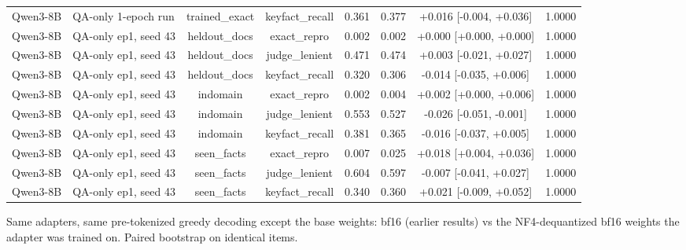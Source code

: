 \begin{table}[t]
{\begin{tabular}{llcccccc}
Qwen3-8B & QA-only 1-epoch run & trained\_exact & keyfact\_recall & 0.361 & 0.377 & +0.016 [-0.004, +0.036] & 1.0000 \\
Qwen3-8B & QA-only ep1, seed 43 & heldout\_docs & exact\_repro & 0.002 & 0.002 & +0.000 [+0.000, +0.000] & 1.0000 \\
Qwen3-8B & QA-only ep1, seed 43 & heldout\_docs & judge\_lenient & 0.471 & 0.474 & +0.003 [-0.021, +0.027] & 1.0000 \\
Qwen3-8B & QA-only ep1, seed 43 & heldout\_docs & keyfact\_recall & 0.320 & 0.306 & -0.014 [-0.035, +0.006] & 1.0000 \\
Qwen3-8B & QA-only ep1, seed 43 & indomain & exact\_repro & 0.002 & 0.004 & +0.002 [+0.000, +0.006] & 1.0000 \\
Qwen3-8B & QA-only ep1, seed 43 & indomain & judge\_lenient & 0.553 & 0.527 & -0.026 [-0.051, -0.001] & 1.0000 \\
Qwen3-8B & QA-only ep1, seed 43 & indomain & keyfact\_recall & 0.381 & 0.365 & -0.016 [-0.037, +0.005] & 1.0000 \\
Qwen3-8B & QA-only ep1, seed 43 & seen\_facts & exact\_repro & 0.007 & 0.025 & +0.018 [+0.004, +0.036] & 1.0000 \\
Qwen3-8B & QA-only ep1, seed 43 & seen\_facts & judge\_lenient & 0.604 & 0.597 & -0.007 [-0.041, +0.027] & 1.0000 \\
Qwen3-8B & QA-only ep1, seed 43 & seen\_facts & keyfact\_recall & 0.340 & 0.360 & +0.021 [-0.009, +0.052] & 1.0000 \\
\bottomrule
\end{tabular}}
\par\smallskip\footnotesize Same adapters, same pre-tokenized greedy decoding except the base weights: bf16 (earlier results) vs the NF4-dequantized bf16 weights the adapter was trained on. Paired bootstrap on identical items.
\end{table}
